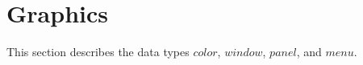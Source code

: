 \chapter{Graphics} \label{Graphics}

This section describes the  data types $color$, $window$, $panel$, and
$menu$. 


\newpage

\newpage

\newpage

\newpage

\newpage

\newpage

\newpage

\newpage

\newpage
